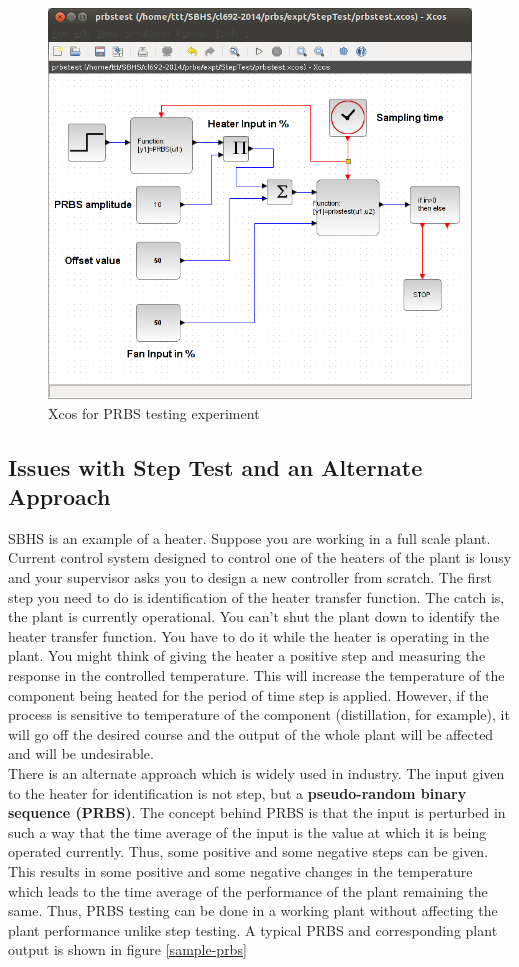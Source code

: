 \begin{figure}
\centering
\includegraphics[width=0.7\linewidth]{prbs/prbs-xcos.png}
\caption{Xcos for PRBS testing experiment}
\label{prbs-xcos}
\end{figure}

\subsection{Issues with Step Test and an Alternate Approach}

SBHS is an example of a heater. Suppose you are working in a full scale plant. Current control system designed to control
one of the heaters of the plant is lousy and your supervisor asks you to design a new controller from scratch. The first step
you need to do is identification of the heater transfer function. The catch is, the plant is currently
operational. You can't shut the plant down to identify the heater transfer function. You have to do it while the heater is
operating in the plant. You might think of giving the heater a positive step and measuring the response in the controlled 
temperature. This will increase the temperature of the component being heated for the period of time step is applied. However,
if the process is sensitive to temperature of the component (distillation, for example), it will go off the desired course and
the output of the whole plant will be affected and will be undesirable.\\

There is an alternate approach which is widely used in industry. The input given to the heater for identification is not 
step, but a \textbf{pseudo-random binary sequence (PRBS)}. The concept behind PRBS is that the input is perturbed in such
a way that the time average of the input is the value at which it is being operated currently. Thus, some positive and some
negative steps can be given. This results in some positive and some negative changes in the temperature which leads to the time
average of the performance of the plant remaining the same. Thus, PRBS testing can be done in a working plant without 
affecting the plant performance unlike step testing. A typical PRBS and corresponding plant output is shown in 
figure \ref{sample-prbs}

